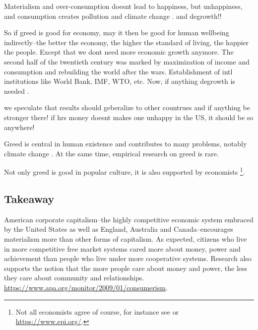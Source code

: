 \documentclass[10pt, letterpaper]{article}
\begin{document}
\begin{spacing}{1.8}
Materialism and over-consumption doesnt lead to happiness, but unhappiness, and consumption creates pollution and climate change \citep{leonard10,pachauri14}.
and degrowth!!

So if greed is good for economy, may it then be good for human wellbeing
indirectly--the better the economy, the higher the standard of living, the
happier the people. Except that we dont need more economic growth anymore.
The second half of the twentieth century was marked
by maximization of income and consumption and rebuilding the world after the
wars. Establishment of intl institutions like World Bank, IMF, WTO, etc. Now, if
anything degrowth is needed \cite{kallis12,kallis11,bergh11}.

we speculate that results should geberalize to other countrues and if anything be stronger there! if hrs money doesnt makes one unhappy in the US, it should be so anywhere!

Greed is central in human existence and contributes to many problems, notably
climate change \citep[e.g.,][]{okulicz19}. At the same time, empirical research
on greed is rare.

Not only greed is good in popular culture, it is also supported by
economists \citep{wang11b,wight2005adam}\footnote{Not all economists agree of course,
  for instance see \citet{wight2005adam} or \url{https://www.epi.org/}.}.

\subsection{Takeaway}

American corporate capitalism--the highly competitive economic system embraced by
the United States as well as England, Australia and Canada--encourages
materialism more than other forms of capitalism.
%
As expected, citizens who live in more competitive free market systems cared more about money, power and achievement than people who live under more cooperative systems. Research also supports the notion that the more people care about money and power, the less they care about community and relationships.
\url{https://www.apa.org/monitor/2009/01/consumerism}.


\end{spacing}
\end{document}
